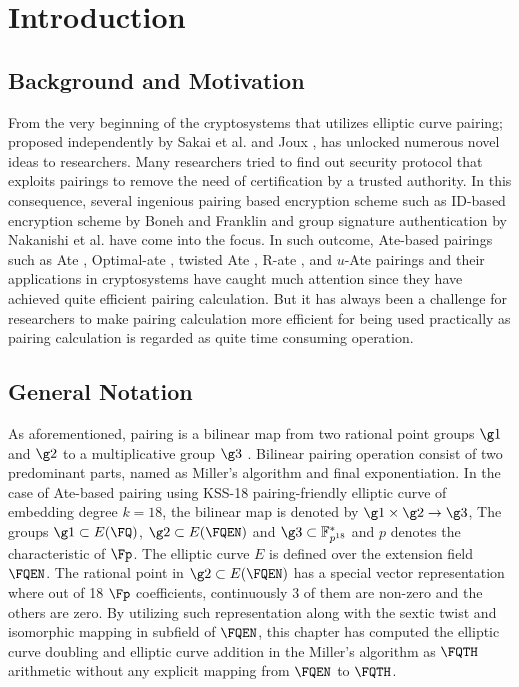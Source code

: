 \section{Introduction}\label{ch3_section_1}
\subsection{Background and Motivation}
From the very beginning of the cryptosystems that utilizes elliptic curve pairing; proposed independently by Sakai et al. \cite{EPRINT:SakKas03} and Joux \cite{JC:Joux04}, has unlocked numerous novel ideas to researchers. 
Many researchers tried to find out security protocol that exploits pairings to remove the need of certification by a trusted authority. 
In this consequence, several ingenious pairing based encryption scheme such as ID-based encryption scheme by  Boneh and Franklin \cite{C:BonFra01} and group signature authentication by Nakanishi et al. \cite{AC:NakFun05} have come into the focus. 
In such outcome, Ate-based pairings such as Ate \cite{DBLP:reference/crc/2005ehcc}, Optimal-ate \cite{DBLP:journals/tit/Vercauteren10}, twisted Ate \cite{EPRINT:MKHO07},  R-ate \cite{r_ate}, and $u$-Ate \cite{PAIRING:NASKM08} pairings and their applications in cryptosystems have caught much attention since they have achieved quite efficient pairing calculation.
But it has always been a challenge for researchers to make pairing calculation more efficient for being used practically as pairing calculation is regarded as quite time consuming operation. 

\subsection{General Notation}
As aforementioned, pairing is a bilinear map from two rational point groups $\g1$ and $\g2$ to a multiplicative group $\g3$ \cite{Silverman}.
Bilinear pairing operation consist of two predominant parts,  named as Miller's algorithm and final exponentiation.
In  the case of  Ate-based pairing using KSS-18 pairing-friendly elliptic curve of embedding degree $k=18$,  the bilinear map is denoted by $\g1 \times \g2 \rightarrow \g3$,
The groups $\g1 \subset E(\FQ)$, $\g2 \subset E(\FQEN)$ and $\g3  \subset \mathbb{F}^*_{p^{18}}$ and  $p$ denotes the characteristic of $\Fp$.
 The elliptic curve $E$ is defined over the extension field $\FQEN$. 
The rational point in $\g2 \subset E(\FQEN)$ has  a special vector representation where out of 18 $\Fp$ coefficients, continuously 3 of them are non-zero and the others are zero. 
By utilizing such representation along with the sextic twist and isomorphic mapping in subfield of $\FQEN$, this chapter has computed the elliptic curve doubling and elliptic curve addition in the Miller's algorithm as $\FQTH$ arithmetic without any explicit mapping from $\FQEN$ to $\FQTH$.

